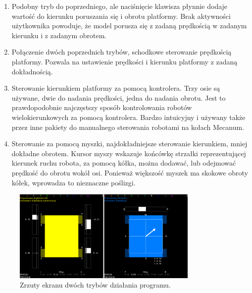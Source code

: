 \begin{enumerate}
				\item Podobny tryb do poprzedniego, ale naciśnięcie klawisza płynnie dodaje wartość do kierunku poruszania się i obrotu platformy.
				Brak aktywności użytkownika powoduje, że model porusza się z zadaną prędkością w zadanym kierunku i z zadanym obrotem.
				\item Połączenie dwóch poprzednich trybów, schodkowe sterowanie prędkością platformy. Pozwala na ustawienie prędkości i kierunku platformy z zadaną dokładnością.
				\item Sterowanie kierunkiem platformy za pomocą kontrolera. Trzy osie są używane, dwie do nadania prędkości, jedna do nadania obrotu.
				Jest to prawdopodobnie najczęstszy sposób kontrolowania robotów wielokierunkowych za pomocą kontrolera.
				Bardzo intuicyjny i używany także przez inne pakiety do manualnego sterowania robotami na kołach Mecanum.
				\item Sterowanie za pomocą myszki, najdokładniejsze sterowanie kierunkiem, mniej dokładne obrotem.
				Kursor myszy wskazuje końcówkę strzałki reprezentującej kierunek ruchu robota, za pomocą kółka, można dodawać, lub odejmować prędkość do obrotu wokół osi.
				Ponieważ większość myszek ma skokowe obroty kółek, wprowadza to nieznaczne poślizgi.
			\end{enumerate}
			
			\begin{figure}[H]
			\centering
			\includegraphics[width=0.8\textwidth]{graphics/lalkarz.png}
			\caption{Zrzuty ekranu dwóch trybów działania programu.}
			\label{fig:lalkarz}
			\end{figure}

			
		

